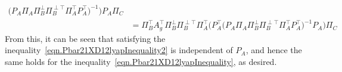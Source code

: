 \begin{proof-dan}
\begin{equation*}
\begin{split}
      \bigr(
      P_{A}\Pi_{A}\Pi_{B}^{\perp}
      \Pi_{B}^{\perp\top}\Pi_{A}^{\top}P_{A}^{\top}
      \bigr)^{-1}\bigr)
      P_{A}\Pi_{C} \\
      &=
      \Pi_{B}^{\top}A_{g}^{\top}\Pi_{B}^{\perp}
      \Pi_{B}^{\perp\top}\Pi_{A}^{\top}
      \bigr(
      P_{A}^{\top}
      \bigr(
      P_{A}\Pi_{A}\Pi_{B}^{\perp}
      \Pi_{B}^{\perp\top}\Pi_{A}^{\top}P_{A}^{\top}
      \bigr)^{-1}
      P_{A}
      \bigr)
      \Pi_{C}
    \end{split}
  \end{equation*}
  From this, it can be seen that satisfying the inequality\ \eqref{eqn.Pbar21XD12lyapInequality2} is independent of $P_{A}$, and hence the same holds for the inequality\ \eqref{eqn.Pbar21XD12lyapInequality}, as desired.
\end{proof-dan}
